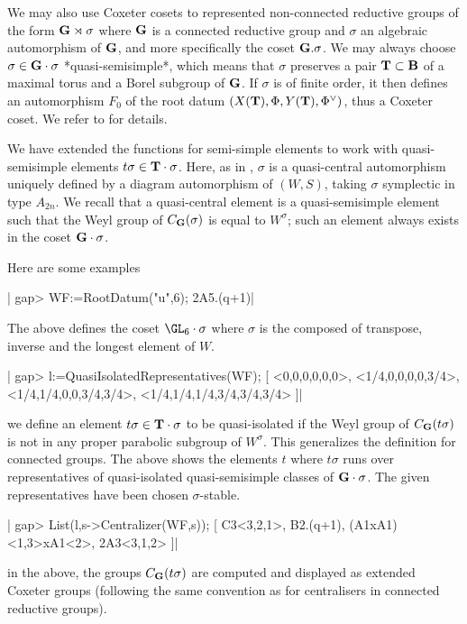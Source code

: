 
We  may  also  use  Coxeter  cosets  to represented non-connected reductive
groups  of the form ${\bf G}\rtimes\sigma$ where ${\bf G}$ is a connected reductive
group   and  $\sigma$  an   algebraic  automorphism  of   ${\bf G}$,  and  more
specifically the coset ${\bf G}.\sigma$. We may always choose
$\sigma\in{\bf G}\cdot\sigma$  *quasi-semisimple*,  which  means  that $\sigma$
preserves a pair ${\bf T}\subset{\bf B}$ of a maximal torus and a Borel subgroup of
${\bf G}$.  If $\sigma$  is of  finite order,  it then  defines an automorphism
$F_0$ of the root datum $(X({\bf T}), \Phi, Y({\bf T}), \Phi^\vee)$, thus a Coxeter
coset. We refer to \cite{ss} for details.

We  have  extended  the  functions  for  semi-simple  elements to work with
quasi-semisimple   elements   $t\sigma\in{\bf T}\cdot\sigma$.   Here,   as   in
\cite{ss},  $\sigma$ is a quasi-central  automorphism uniquely defined by a
diagram  automorphism  of  $(W,S)$,  taking  $\sigma$  symplectic  in  type
$A_{2n}$.  We  recall  that  a  quasi-central element is a quasi-semisimple
element such that the Weyl group of $C_{\bf G}(\sigma)$ is equal to $W^\sigma$;
such an element always exists in the coset ${\bf G}\cdot\sigma$.

Here are some examples\:

|    gap> WF:=RootDatum("u",6);
    2A5.(q+1)|

The above defines the coset $\GL_6\cdot\sigma$ where $\sigma$ is the composed
of transpose, inverse and the longest element of $W$.

|    gap> l:=QuasiIsolatedRepresentatives(WF);
    [ <0,0,0,0,0,0>, <1/4,0,0,0,0,3/4>, <1/4,1/4,0,0,3/4,3/4>,
      <1/4,1/4,1/4,3/4,3/4,3/4> ]|

we define an element $t\sigma\in{\bf T}\cdot\sigma$ to be quasi-isolated if the
Weyl  group of $C_{\bf G}(t\sigma)$ is not  in any proper parabolic subgroup of
$W^\sigma$. This generalizes the definition for connected groups. The above
shows  the  elements  $t$  where  $t\sigma$  runs  over  representatives of
quasi-isolated  quasi-semisimple  classes  of  ${\bf G}\cdot\sigma$.  The given
representatives have been chosen $\sigma$-stable.

|    gap> List(l,s->Centralizer(WF,s));
    [ C3<3,2,1>, B2.(q+1), (A1xA1)<1,3>xA1<2>, 2A3<3,1,2> ]|

in  the above,  the groups  $C_{\bf G}(t\sigma)$ are  computed and displayed as
extended  Coxeter groups (following the same convention as for centralisers
in connected reductive groups).

